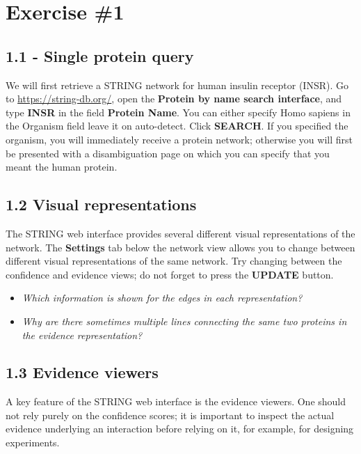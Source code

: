 \documentclass[a4paper]{article}
\begin{document}
\section*{Exercise \#1}

\vspace{0,5cm}

\subsection*{1.1 - Single protein query}
We will first retrieve a STRING network for human insulin receptor (INSR). Go to \url{https://string-db.org/}, open the \textbf{Protein by name search interface}, and type \textbf{INSR} in the field \textbf{Protein Name}. You can either specify Homo sapiens in the Organism field leave it on auto-detect. Click \textbf{SEARCH}. If you specified the organism, you will immediately receive a protein network; otherwise you will first be presented with a disambiguation page on which you can specify that you meant the human protein.

\vspace{0,5cm}

\subsection*{1.2 Visual representations}
The STRING web interface provides several different visual representations of the network. The \textbf{Settings} tab below the network view allows you to change between different visual representations of the same network. Try changing between the confidence and evidence views; do not forget to press the \textbf{UPDATE} button.
\begin{itemize}
  \item \textit{Which information is shown for the edges in each representation?}
  \item \textit{Why are there sometimes multiple lines connecting the same two proteins in the evidence representation?}
\end{itemize}

\vspace{0,5cm}

\subsection*{1.3 Evidence viewers}
A key feature of the STRING web interface is the evidence viewers. One should not rely purely on the confidence scores; it is important to inspect the actual evidence underlying an interaction before relying on it, for example, for designing experiments.
\end{document}
